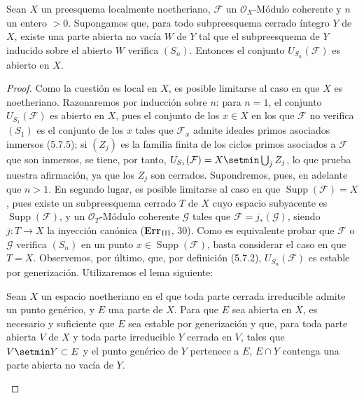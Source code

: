 \begin{proposition}[6.11.6]
\label{IV.2.s6.11.6-fr}
Sean $X$ un preesquema localmente noetheriano, $\mathcal F$ un
$\mathcal O_X$-Módulo coherente y $n$ un entero $>0$. Supongamos que, para todo
subpreesquema cerrado íntegro $Y$ de $X$, existe una parte abierta no
vacía $W$ de $Y$ tal que el subpreesquema de $Y$ inducido sobre el abierto $W$
verifica $(S_n)$. Entonces el conjunto $U_{S_n}(\mathcal F)$ es abierto en
$X$.
\end{proposition}


\begin{proof}
Como la cuestión es local en $X$, es posible limitarse al caso en que $X$ es
noetheriano. Razonaremos por inducción sobre $n$: para $n=1$,
el conjunto $U_{S_1}(\mathcal F)$ es abierto en $X$, pues el conjunto de los
$x\in X$ en los que $\mathcal F$ no verifica $(S_1)$ es el conjunto de los $x$ tales
que $\mathcal F_x$ admite ideales primos asociados inmersos (5.7.5);
si $(Z_j)$ es la familia finita de los ciclos primos asociados a $\mathcal F$
que son inmersos, se tiene, por tanto,
$U_{S_1}(\mathcal F)=X\setmin\bigcup_jZ_j$, lo que prueba nuestra afirmación, ya que los
$Z_j$ son cerrados. Supondremos, pues, en adelante que $n>1$. En segundo
lugar, es posible limitarse al caso en que
$\operatorname{Supp}(\mathcal F)=X$, pues existe un subpreesquema cerrado
$T$ de $X$ cuyo espacio subyacente es $\operatorname{Supp}(\mathcal F)$,
y un $\mathcal O_T$-Módulo coherente $\mathcal G$ tales que
$\mathcal F=j_*(\mathcal G)$, siendo $j:T\to X$ la inyección canónica
(\textbf{Err}$_{\rm III}$, 30). Como es equivalente probar que $\mathcal F$
o $\mathcal G$ verifica $(S_n)$ en un punto
$x\in\operatorname{Supp}(\mathcal F)$, basta considerar el
caso en que $T=X$. Observemos, por último, que, por definición (5.7.2),
$U_{S_n}(\mathcal F)$ es estable por generización. Utilizaremos el
lema siguiente:

\begin{lemma}[6.11.6.1]
\label{IV.2.s6.11.6.1-fr}
Sean $X$ un espacio noetheriano en el que toda parte cerrada irreducible
admite un punto genérico, y $E$ una parte de $X$. Para que $E$ sea abierta
en $X$, es necesario y suficiente que $E$ sea estable por generización y que,
para toda parte abierta $V$ de $X$ y toda parte irreducible $Y$ cerrada
en $V$, tales que $V\setmin Y\subset E$ y el punto genérico de $Y$
pertenece a $E$, $E\cap Y$ contenga una parte abierta no vacía de $Y$.
\end{lemma}


\end{proof}
